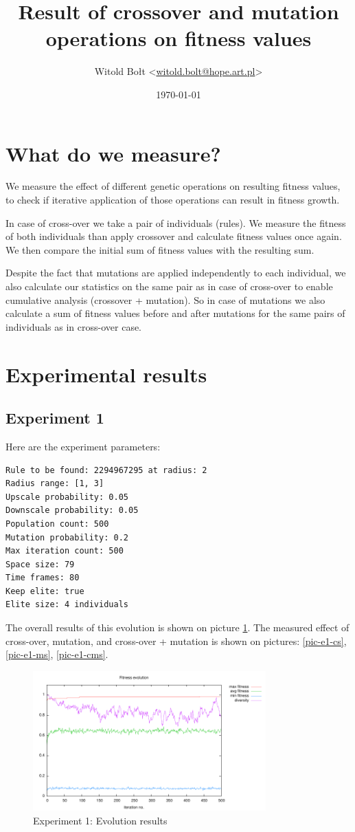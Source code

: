 \documentclass[12pt,a4paper]{article}
\title{Result of crossover and mutation operations on fitness values}
\author{Witold Bołt <\href{mailto:witold.bolt@hope.art.pl}{witold.bolt@hope.art.pl}>}
\date{\today}
\begin{document}
\maketitle

\section{What do we measure?}
We measure the effect of different genetic operations on resulting fitness values, to check if iterative application of those operations can result in fitness growth.

In case of cross-over we take a pair of individuals (rules). We measure the fitness of both individuals than apply crossover and calculate fitness values once again. We then compare the initial sum of fitness values with the resulting sum.

Despite the fact that mutations are applied independently to each individual, we also calculate our statistics on the same pair as in case of cross-over to enable cumulative analysis (crossover + mutation). So in case of mutations we also calculate a sum of fitness values before and after mutations for the same pairs of individuals as in cross-over case.

\section{Experimental results}

\subsection{Experiment 1}
Here are the experiment parameters:

\begin{verbatim}
Rule to be found: 2294967295 at radius: 2
Radius range: [1, 3]
Upscale probability: 0.05
Downscale probability: 0.05
Population count: 500
Mutation probability: 0.2
Max iteration count: 500
Space size: 79
Time frames: 80
Keep elite: true
Elite size: 4 individuals
\end{verbatim}

The overall results of this evolution is shown on picture \ref{pic-e1-results}. The measured effect of cross-over, mutation, and cross-over + mutation is shown on pictures: \ref{pic-e1-cs}, \ref{pic-e1-ms}, \ref{pic-e1-cms}.


\begin{figure}
\centering
\includegraphics[width=0.8\textwidth]{results/1/1.pdf}
\caption{Experiment 1: Evolution results}
\label{pic-e1-results}
\end{figure}
\end{document}
